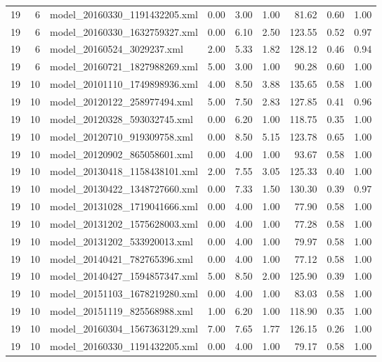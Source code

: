 \begin{table}[ht]
\begin{tabular}{rrlrrrrrr}
   19 &   6 & model\_20160330\_1191432205.xml & 0.00 & 3.00 & 1.00 & 81.62 & 0.60 & 1.00 \\ 
   19 &   6 & model\_20160330\_1632759327.xml & 0.00 & 6.10 & 2.50 & 123.55 & 0.52 & 0.97 \\ 
   19 &   6 & model\_20160524\_3029237.xml & 2.00 & 5.33 & 1.82 & 128.12 & 0.46 & 0.94 \\ 
   19 &   6 & model\_20160721\_1827988269.xml & 5.00 & 3.00 & 1.00 & 90.28 & 0.60 & 1.00 \\ 
   19 &  10 & model\_20101110\_1749898936.xml & 4.00 & 8.50 & 3.88 & 135.65 & 0.58 & 1.00 \\ 
   19 &  10 & model\_20120122\_258977494.xml & 5.00 & 7.50 & 2.83 & 127.85 & 0.41 & 0.96 \\ 
   19 &  10 & model\_20120328\_593032745.xml & 0.00 & 6.20 & 1.00 & 118.75 & 0.35 & 1.00 \\ 
   19 &  10 & model\_20120710\_919309758.xml & 0.00 & 8.50 & 5.15 & 123.78 & 0.65 & 1.00 \\ 
   19 &  10 & model\_20120902\_865058601.xml & 0.00 & 4.00 & 1.00 & 93.67 & 0.58 & 1.00 \\ 
   19 &  10 & model\_20130418\_1158438101.xml & 2.00 & 7.55 & 3.05 & 125.33 & 0.40 & 1.00 \\ 
   19 &  10 & model\_20130422\_1348727660.xml & 0.00 & 7.33 & 1.50 & 130.30 & 0.39 & 0.97 \\ 
   19 &  10 & model\_20131028\_1719041666.xml & 0.00 & 4.00 & 1.00 & 77.90 & 0.58 & 1.00 \\ 
   19 &  10 & model\_20131202\_1575628003.xml & 0.00 & 4.00 & 1.00 & 77.28 & 0.58 & 1.00 \\ 
   19 &  10 & model\_20131202\_533920013.xml & 0.00 & 4.00 & 1.00 & 79.97 & 0.58 & 1.00 \\ 
   19 &  10 & model\_20140421\_782765396.xml & 0.00 & 4.00 & 1.00 & 77.12 & 0.58 & 1.00 \\ 
   19 &  10 & model\_20140427\_1594857347.xml & 5.00 & 8.50 & 2.00 & 125.90 & 0.39 & 1.00 \\ 
   19 &  10 & model\_20151103\_1678219280.xml & 0.00 & 4.00 & 1.00 & 83.03 & 0.58 & 1.00 \\ 
   19 &  10 & model\_20151119\_825568988.xml & 1.00 & 6.20 & 1.00 & 118.90 & 0.35 & 1.00 \\ 
   19 &  10 & model\_20160304\_1567363129.xml & 7.00 & 7.65 & 1.77 & 126.15 & 0.26 & 1.00 \\ 
   19 &  10 & model\_20160330\_1191432205.xml & 0.00 & 4.00 & 1.00 & 79.17 & 0.58 & 1.00 \\ 

\end{tabular}
\end{table}

